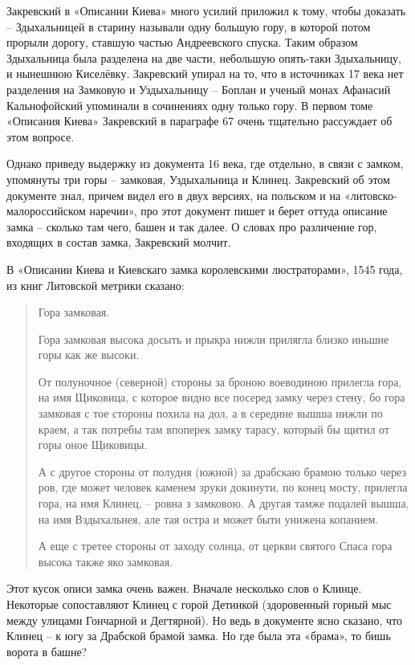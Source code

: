 Закревский в «Описании Киева» много усилий приложил к тому, чтобы доказать – Здыхальницей в старину называли одну большую гору, в которой потом прорыли дорогу, ставшую частью Андреевского спуска. Таким образом Здыхальница была разделена на две части, небольшую опять-таки Здыхальницу, и нынешнюю Киселёвку. Закревский упирал на то, что в источниках 17 века нет разделения на Замковую и Уздыхальницу – Боплан и ученый монах Афанасий Кальнофойский упоминали в сочинениях одну только гору. В первом томе «Описания Киева» Закревский в параграфе 67 очень тщательно рассуждает об этом вопросе.

Однако приведу выдержку из документа 16 века, где отдельно, в связи с замком, упомянуты три горы – замковая, Уздыхальница и Клинец. Закревский об этом документе знал, причем видел его в двух версиях, на польском и на «литовско-малороссийском наречии», про этот документ пишет и берет оттуда описание замка – сколько там чего, башен и так далее. О словах про различение гор, входящих в состав замка, Закревский молчит.

В «Описании Киева и Киевскаго замка королевскими люстраторами», 1545 года, из книг Литовской метрики сказано\cite{sbornikmat}:

\begin{quotation}
Гора замковая.

Гора замковая высока досыть и прыкра нижли прилягла близко иньшие горы как же высоки.

От полуночное (северной) стороны за броною воеводиною прилегла гора, на имя Щиковица, с которое видно все посеред замку через стену, бо гора замковая с тое стороны похила на дол, а в середине вышша нижли по краем, а так потребы там впоперек замку тарасу, который бы щитил от горы оное Щиковицы.

А с другое стороны от полудня (южной) за драбскаю брамою только через ров, где может человек каменем зруки докинути, по конец мосту, прилегла гора, на имя Клинец, – ровна з замковою. А другая тамже подалей вышша, на имя Вздыхальнея, але тая остра и может быти унижена копанием.

А еще с третее стороны от заходу солнца, от церкви святого Спаса гора высока также яко замковая.
\end{quotation}

Этот кусок описи замка очень важен. Вначале неско\-лько слов о Клинце. Некоторые сопоставляют Клинец с горой Детинкой (здоровенный горный мыс между улицами Гончарной и Дегтярной). Но ведь в документе ясно сказано, что Клинец – к югу за Драбской брамой замка. Но где была эта «брама», то бишь ворота в башне?

